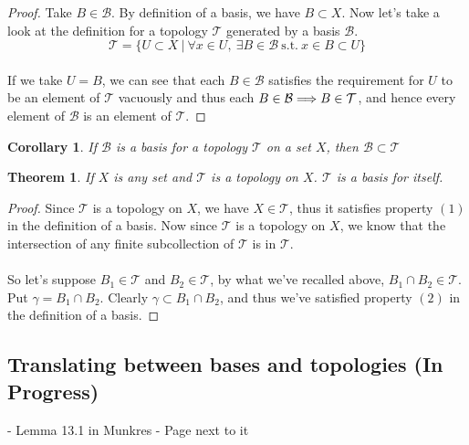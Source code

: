 \documentclass{article}
\newtheorem{theorem}{Theorem}[section]
\newtheorem{corollary}{Corollary}[theorem]
\theoremstyle{remark}
\theoremstyle{definition}
\newcommand{\simplies}{\DOTSB\Longrightarrow}
\begin{document}
\begin{proof}
Take $B \in \mathcal{B}$. By definition of a basis, we have $B \subset X$. Now let's take a look at the definition for a topology $\mathcal{T}$ generated by a basis $\mathcal{B}$. $$\mathcal{T} = \{ U \subset X \ | \ \forall x \in U, \ \exists B \in \mathcal{B} \ \text{s.t.} \ x \in B \subset U\}$$
\\ 
If we take $U = B$, we can see that each $B \in \mathcal{B}$ satisfies the requirement for $U$ to be an element of $\mathcal{T}$ vacuously and thus each $B \in \mathcal{B} \simplies B \in \mathcal{T}$, and hence every element of $\mathcal{B}$ is an element of $\mathcal{T}$.
\end{proof}



\begin{corollary}
If $\mathcal{B}$ is a basis for a topology $\mathcal{T}$ on a set $X$, then $\mathcal{B} \subset \mathcal{T}$
\end{corollary}

\newpage

\begin{theorem}
If $X$ is any set and $\mathcal{T}$ is a topology on $X$. $\mathcal{T}$ is a basis for itself.
\end{theorem}

\begin{proof}
Since $\mathcal{T}$ is a topology on $X$, we have $X \in \mathcal{T}$, thus it satisfies property $(1)$ in the definition of a basis. Now since $\mathcal{T}$ is a topology on $X$, we know that the intersection of any finite subcollection of $\mathcal{T}$ is in $\mathcal{T}$.
\\ \\
So let's suppose $B_1 \in \mathcal{T}$ and $B_2 \in \mathcal{T}$, by what we've recalled above, $B_1 \cap B_2 \in \mathcal{T}$. Put $\gamma = B_1 \cap B_2$. Clearly $\gamma \subset B_1 \cap B_2$, and thus we've satisfied property $(2)$ in the definition of a basis. 
\end{proof}




\newpage

\subsection{Translating between bases and topologies (In Progress)}

- Lemma 13.1 in Munkres
- Page next to it

\newpage
\end{document}
